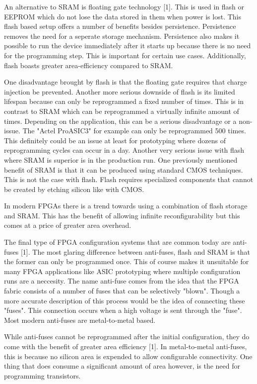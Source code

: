 \documentclass{article}
\begin{document}
    An alternative to SRAM is floating gate technology [1]. This is used
    in flash or EEPROM which do not lose the data stored in them when power is lost.
    This flash based setup offers a number of benefits besides persistence.
    Persistence removes the need for a seperate storage mechanism. Persistence also
    makes it possible to run the device immediately after it starts up because there
    is no need for the programming step. This is important for certain use cases.
    Additionally, flash boasts greater area-efficiency compared to SRAM.

    One disadvantage brought by flash is that the floating gate requires that
    charge injection be prevented. Another more serious downside of flash
    is its limited lifespan because can only be reprogrammed a fixed number of times.
    This is in contrast to SRAM which can be reprogrammed a virtually infinite amount of times.
    Depending on the application, this can be a serious disadvantage or a non-issue.
    The "Actel ProASIC3" for example can only be reprogrammed 500 times.
    This definitely could be an issue at least for prototyping where dozens of reprogramming
    cycles can occur in a day. Another very serious issue with flash where SRAM
    is superior is in the production run. One previously mentioned benefit of SRAM
    is that it can be produced using standard CMOS techniques. This is not the case with
    flash. Flash requires specialized components that cannot be created by etching
    silicon like with CMOS.

    In modern FPGAs there is a trend towards using a combination of flash storage and SRAM.
    This has the benefit of allowing infinite reconfigurability but this comes at a price
    of greater area overhead.

    The final type of FPGA configuration systems that are common today are anti-fuses [1].
    The most glaring difference between anti-fuses, flash and SRAM is that the former
    can only be programmed once. This of course makes it unsuitable for many FPGA applications
    like ASIC prototyping where multiple configuration runs are a neccesity.
    The name anti-fuse comes from the idea that the FPGA fabric consists of a number of fuses
    that can be selectively "blown". Though a more accurate description of this process
    would be the idea of connecting these "fuses". This connection occurs when a high voltage
    is sent through the "fuse". Most modern anti-fuses are metal-to-metal based.

    While anti-fuses cannot be reprogrammed after the initial configuration,
    they do come with the benefit of greater area efficiency [1]. In metal-to-metal
    anti-fuses, this is because no silicon area is expended to allow configurable connectivity.
    One thing that does consume a significant amount of area however, is the need for
    programming transistors.
\end{document}
